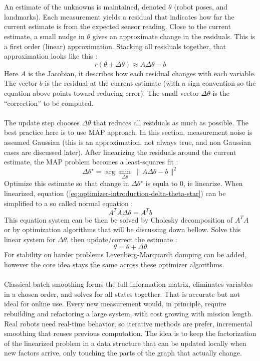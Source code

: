 \\ \\
An estimate of the unknowns is maintained, denoted $\theta$ (robot poses, and landmarks). Each measurement yields a residual that indicates how far the current estimate is from the expected sensor reading. Close to the current estimate, a small nudge in $\theta$ gives an approximate change in the residuals. This is a first order (linear) approximation. Stacking all residuals together, that approximation looks like this \cite{iSAM_paper}:
$$
    r(\theta + \Delta\theta) \approx A\Delta\theta - b
$$
Here $A$ is the Jacobian, it describes how each residual changes with each variable. The vector $b$ is the residual at the current estimate (with a sign convention so the equation above points toward reducing error). The small vector $\Delta\theta$ is the ``correction'' to be computed. \cite{iSAM_paper}
\\ \\
The update step chooses $\Delta\theta$ that reduces all residuals as much as possible. The best practice here is to use MAP approach. In this section, measurement noise is assumed Gaussian (this is an approximation, not always true, and non Gaussian cases are discussed later). After linearizing the residuals around the current estimate, the MAP problem becomes a least-squares fit \cite{iSAM_paper}:
\begin{equation}
    \Delta\theta^\star = \arg\min_{\Delta\theta}\; \|A\Delta\theta - b\|^2
    \label{eq:optimizer-introduction-delta-theta-star}
\end{equation}
Optimize this estimate so that change in $\Delta\theta^\star$ is equla to 0, ie linearize. When linearized, equation (\ref{eq:optimizer-introduction-delta-theta-star}) can be simplified to a so called normal equation \cite{iSAM_paper}:
$$
    A^{T}A\Delta\theta = A^{T}b
$$
This equation system can be then be solved by Cholesky decomposition of $A^{T}A$ or by optimization algorithms that will be discussing down bellow. Solve this linear system for $\Delta\theta$, then update/correct the estimate \cite{iSAM_paper}:
$$
    \theta = \theta + \Delta\theta
$$
For stability on harder problems Levenberg-Marquardt damping can be added, however the core idea stays the same across these optimizer algorithms. \cite{iSAM2_paper}
\\ \\
Classical batch smoothing forms the full information matrix, eliminates variables in a chosen order, and solves for all states together. That is accurate but not ideal for online use. Every new measurement would, in principle, require rebuilding and refactoring a large system, with cost growing with mission length. Real robots need real-time behavior, so iterative methods are prefer, incremental smoothing that reuses previous computation. The idea is to keep the factorization of the linearized problem in a data structure that can be updated locally when new factors arrive, only touching the parts of the graph that actually change.
